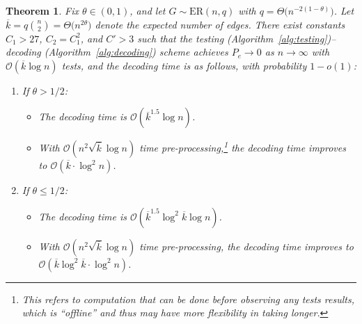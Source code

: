 \documentclass[journal]{IEEEtran}
\newtheorem{theorem}{Theorem}
\theoremstyle{definition}
\theoremstyle{definition}
\newcommand{\ER}{\mathrm{ER}}
\newcommand{\kb}{\overline{k}}
\newcommand{\bigO}{\mathcal{O}}
\begin{document}
\begin{theorem}
\label{thm:main}
Fix \( \theta \in (0,1) \), and let \( G \sim \ER(n, q) \) with \( q = \Theta \big(n^{-2(1 - \theta)}\big) \).
Let \( \kb = q \binom{n}{2} = \Theta \big(n^{2\theta}\big) \) denote the expected number of edges.
There exist constants \( C_1 > 27 \), \( C_2 = C_1^2 \), and \( C' > 3 \) such that the testing (Algorithm~\ref{alg:testing})–decoding (Algorithm~\ref{alg:decoding}) scheme achieves \( P_e \to 0 \) as \( n \to \infty \) with \( \bigO(\kb \log n) \) tests, and the decoding time is as follows, with probability \( 1 - o(1) \):
\begin{enumerate}[label=(\alph*)]
    \item If \( \theta > 1/2 \):
    \begin{itemize}
        \item The decoding time is \( \bigO \left(\kb^{1.5} \log n\right) \).
        \item With $\bigO(n^2 \sqrt{\kb} \log n)$ time pre-processing,\footnote{This refers to computation that can be done before observing any tests results, which is ``offline'' and thus may have more flexibility in taking longer.} the decoding time improves to \( \bigO \left(\kb \cdot \log^2 n\right) \).
    \end{itemize}

    \item If \( \theta \le 1/2 \):
    \begin{itemize}
        \item The decoding time is \( \bigO \left(\kb^{1.5} \log^2 \kb \log n\right) \).
        \item With $\bigO(n^2 \sqrt{\kb} \log n)$ time pre-processing, the decoding time improves to \( \bigO \left(\kb \log^2 \kb \cdot \log^2 n\right) \).
    \end{itemize}
\end{enumerate}
\end{theorem}
\end{document}
